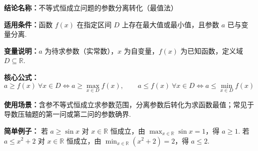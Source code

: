 \textbf{结论名称：}不等式恒成立问题的参数分离转化（最值法）

\textbf{适用条件：}函数 $f(x)$ 在指定区间 $D$ 上存在最大值或最小值，且参数 $a$ 已与变量分离.

\textbf{变量说明：}$a$ 为待求参数（实常数），$x$ 为自变量，$f(x)$ 为已知函数，定义域 $D\subseteq\mathbb{R}$.

\textbf{核心公式：}
\[
\boxed{a \geq f(x)\ \forall x\in D \iff a \geq \max_{x\in D} f(x)},\qquad
\boxed{a \leq f(x)\ \forall x\in D \iff a \leq \min_{x\in D} f(x)}
\]

\textbf{使用场景：}含参不等式恒成立求参数范围，分离参数后转化为求函数最值；常见于导数压轴题的第一问或第二问的参数确界.

\textbf{简单例子：}
若 $a \geq \sin x$ 对 $x\in\mathbb{R}$ 恒成立，由 $\displaystyle\max_{x\in\mathbb{R}}\sin x = 1$，得 $a \geq 1$.
若 $a \leq x^{2}+2$ 对 $x\in\mathbb{R}$ 恒成立，由 $\displaystyle\min_{x\in\mathbb{R}}(x^{2}+2)=2$，得 $a \leq 2$.